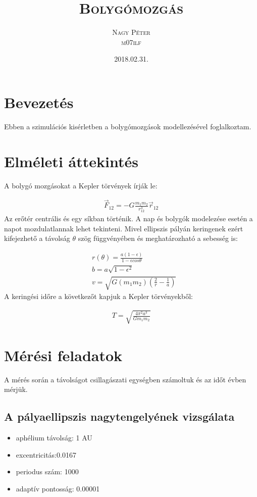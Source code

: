\documentclass[paper=a4, fontsize=11pt]{article}
\title{\scshape\Huge Bolygómozgás }
\date{\scshape\Large 2018.02.31.}
\author{\scshape\huge Nagy Péter\\\scshape\huge m07ilf}
\begin{document}
\maketitle
\newpage
\vspace{11cm}
\tableofcontents
\newpage
\section{Bevezetés}
Ebben a szimulációs kisérletben a bolygómozgások modellezésével foglalkoztam.

\section{Elméleti áttekintés}
A bolygó mozgásokat a Kepler törvények írják le:



\begin{align}
\overrightarrow{F}_{12}=-G\frac{m_1m_2}{r_{12}^3}\overrightarrow{r}_{12}
\end{align}
Az erőtér centrális és egy síkban történik. A nap és bolygók modelezése esetén a napot mozdulatlannak lehet tekinteni. Mivel ellipszis pályán keringenek ezért kifejezhető a távolság $\theta$ szög függvényében és meghatározható a sebesség is:


\begin{align}
&r(\theta)=\frac{a(1-\epsilon)}{1-\epsilon cos\theta}\\
&b=a\sqrt{1-\epsilon^2}\\
&v=\sqrt{G(m_1m_2)(\frac{2}{r}-\frac{1}{a})}
\end{align}
A keringési időre a következőt kapjuk a Kepler törvényekből:




\begin{align}
T=\sqrt{\frac{4\pi^2a^3}{Gm_1m_2}}
\end{align}




\section{Mérési feladatok}
A mérés során a távolságot csillagászati egységben számoltuk és az időt évben mérjük.

\subsection{A pályaellipszis nagytengelyének vizsgálata}
\begin{itemize}
  \item aphélium távolság: 1 AU
  \item excentricitás:0.0167
  \item periodus szám: 1000
  \item adaptív pontosság: 0.00001
\end{itemize}
\end{document}
